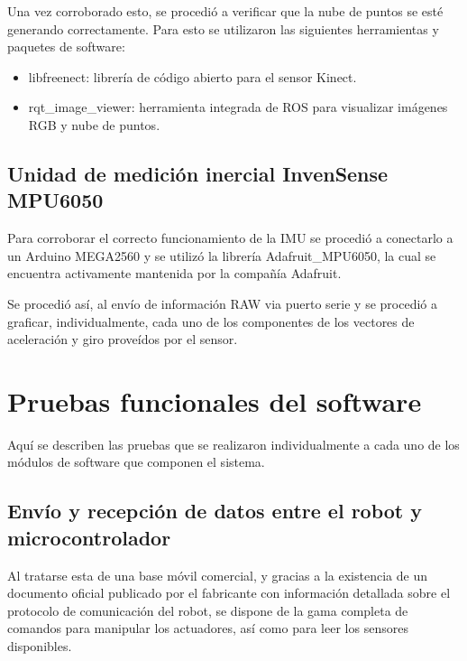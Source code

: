 
Una vez corroborado esto, se procedió a verificar que la nube de puntos se esté generando correctamente. Para esto se utilizaron las siguientes herramientas y paquetes de software:

\begin{itemize}

    \item libfreenect: librería de código abierto para el sensor Kinect.
    \item rqt\_image\_viewer: herramienta integrada de ROS para visualizar imágenes RGB y nube de puntos.

\end{itemize}


\subsection{Unidad de medición inercial InvenSense MPU6050}

Para corroborar el correcto funcionamiento de la IMU se procedió a conectarlo a un Arduino MEGA2560 y se utilizó la librería Adafruit\_MPU6050, la cual se encuentra activamente mantenida por la compañía Adafruit.

Se procedió así, al envío de información RAW via puerto serie y se procedió a graficar, individualmente, cada uno de los componentes de los vectores de aceleración y giro proveídos por el sensor.



\section{Pruebas funcionales del software}
\label{sec:pruebasSW}

Aquí se describen las pruebas que se realizaron individualmente a cada uno de los módulos de software que componen el sistema.

\subsection{Envío y recepción de datos entre el robot y microcontrolador}

Al tratarse esta de una base móvil comercial, y gracias a la existencia de un documento oficial publicado por el fabricante con información detallada sobre el protocolo de comunicación del robot, se dispone de la gama completa de comandos para manipular los actuadores, así como para leer los sensores disponibles.

